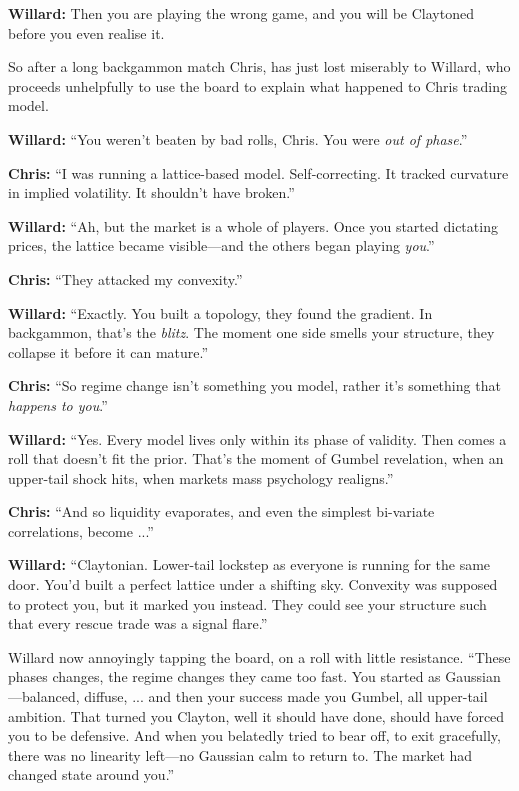\textbf{Willard:}  
Then you are playing the wrong game,
and you will be Claytoned before you even realise it.


So after a long backgammon match Chris, has just lost miserably to Willard, who proceeds unhelpfully to use the board to explain what happened to Chris trading model.

\noindent\textbf{Willard:} ``You weren’t beaten by bad rolls, Chris. You were \textit{out of phase}.''

\noindent\textbf{Chris:} ``I was running a lattice-based model. Self-correcting. It tracked curvature in implied volatility. It shouldn’t have broken.''

\noindent\textbf{Willard:} ``Ah, but the market is a whole of players. Once you started dictating prices, the lattice became visible—and the others began playing \textit{you}.''

\noindent\textbf{Chris:} ``They attacked my convexity.''

\noindent\textbf{Willard:} ``Exactly. You built a topology, they found the gradient. In backgammon, that’s the \textit{blitz}. The moment one side smells your structure, they collapse it before it can mature.''

\vspace{0.5em}

\noindent\textbf{Chris:} ``So regime change isn’t something you model, rather it’s something that \textit{happens to you}.''

\noindent\textbf{Willard:} ``Yes. Every model lives only within its phase of validity. Then comes a roll that doesn’t fit the prior. That’s the moment of Gumbel revelation, when an upper-tail shock hits, when markets mass psychology realigns.''

\noindent\textbf{Chris:} ``And so liquidity evaporates, and even the simplest bi-variate correlations, become ...''

\noindent\textbf{Willard:} ``Claytonian. Lower-tail lockstep as everyone is running for the same door. You’d built a perfect lattice under a shifting sky. Convexity was supposed to protect you, but it marked you instead. They could see your structure such that every rescue trade was a signal flare.''

\vspace{0.5em}

Willard now annoyingly tapping the board, on a roll with little resistance.  
``These phases changes, the regime changes they came too fast. You started as Gaussian—balanced, diffuse, ...  and then your success made you Gumbel, all upper-tail ambition.  That turned you Clayton, well it should have done, should have forced you to be defensive. And when you belatedly tried to bear off, to exit gracefully, there was no linearity left—no Gaussian calm to return to.  The market had changed state around you.''

